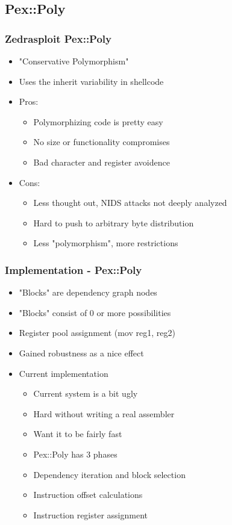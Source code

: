 \documentclass{beamer}
\newenvironment{sitemize}{\vspace{1mm}\begin{itemize}\itemsep 4pt\small}{\end{itemize}}
\begin{document}
\subsection{Pex::Poly}

\begin{frame}[t]
  \frametitle{Zedrasploit Pex::Poly}
  \begin{sitemize}
    \item "Conservative Polymorphism"
    \item Uses the inherit variability in shellcode
    \pause
    \item Pros:
    \begin{sitemize}
      \item Polymorphizing code is pretty easy
      \item No size or functionality compromises
      \item Bad character and register avoidence
    \end{sitemize}
    \pause
    \item Cons:
    \begin{sitemize}
      \item Less thought out, NIDS attacks not deeply analyzed
      \item Hard to push to arbitrary byte distribution
      \item Less "polymorphism", more restrictions
    \end{sitemize}
  \end{sitemize}
\end{frame}

\begin{frame}[t]
  \frametitle{Implementation - Pex::Poly}
  \begin{sitemize}
    \item "Blocks" are dependency graph nodes
    \item "Blocks" consist of 0 or more possibilities
    \item Register pool assignment (mov reg1, reg2)
    \item Gained robustness as a nice effect
    \pause
    \item Current implementation
    \begin{sitemize}
      \item Current system is a bit ugly
      \item Hard without writing a real assembler
      \item Want it to be fairly fast
      \pause
      \item Pex::Poly has 3 phases
      \item Dependency iteration and block selection
      \item Instruction offset calculations
      \item Instruction register assignment
    \end{sitemize}
  \end{sitemize}
\end{frame}
\end{document}
